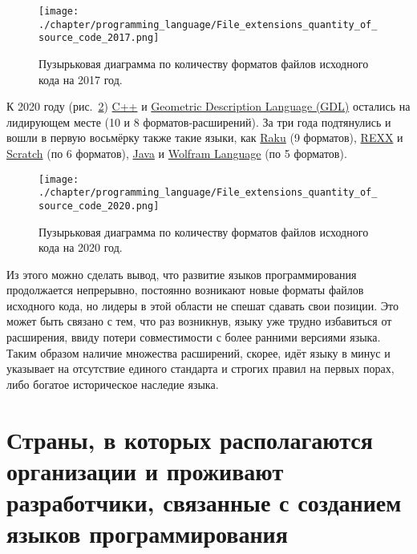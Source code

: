 \begin{figure}
\centering
	\texttt{[image: ./chapter/programming\_language/File\_extensions\_quantity\_of\_source\_code\_2017.png]}
	\label{fig:source_format_2017}
	\caption{Пузырьковая диаграмма по количеству форматов файлов исходного кода на 2017 год.}
\end{figure}
К 2020 году (рис.~\ref{fig:source_format_2020}) \href{https://en.wikipedia.org/wiki/C++}{C++} и \href{https://en.wikipedia.org/wiki/Geometric_Description_Language}{Geometric Description Language (GDL)} остались на лидирующем месте (10 и 8 форматов-расширений). За три года подтянулись и вошли в первую восьмёрку также такие языки, как \href{https://en.wikipedia.org/wiki/Raku_(programming_language)}{Raku} (9 форматов), \href{https://en.wikipedia.org/wiki/Rexx}{REXX} и \href{https://en.wikipedia.org/wiki/Scratch_(programming_language)}{Scratch} (по 6 форматов), \href{https://ru.wikipedia.org/wiki/Java}{Java} и \href{https://en.wikipedia.org/wiki/Wolfram_Language}{Wolfram Language} (по 5 форматов).
\begin{figure}
\centering
	\texttt{[image: ./chapter/programming\_language/File\_extensions\_quantity\_of\_source\_code\_2020.png]}
	\label{fig:source_format_2020}
	\caption{Пузырьковая диаграмма по количеству форматов файлов исходного кода на 2020 год.}
\end{figure}

Из этого можно сделать вывод, что развитие языков программирования продолжается непрерывно, постоянно возникают новые форматы файлов исходного кода, но лидеры в этой области не спешат сдавать свои позиции. Это может быть связано с тем, что раз возникнув, языку уже трудно избавиться от расширения, ввиду потери совместимости с более ранними версиями языка. Таким образом наличие множества расширений, скорее, идёт языку в минус и указывает на отсутствие единого стандарта и строгих правил на первых порах, либо богатое историческое наследие языка.

\section{Страны, в которых располагаются организации и проживают разработчики, связанные с созданием языков программирования}

